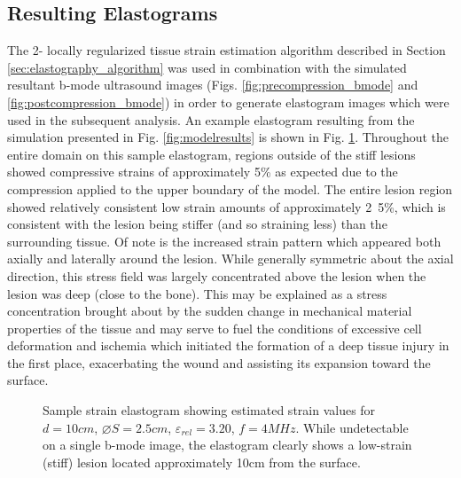 		\subsection{Resulting Elastograms}
			\label{sec:elastogram}
			The 2- locally regularized tissue strain estimation algorithm described in Section \ref{sec:elastography_algorithm} was used in combination with the simulated resultant b-mode ultrasound images (Figs. \ref{fig:precompression_bmode} and \ref{fig:postcompression_bmode}) in order to generate elastogram images which were used in the subsequent analysis. An example elastogram resulting from the simulation presented in Fig. \ref{fig:modelresults} is shown in Fig. \ref{fig:sample_elastogram}. Throughout the entire domain on this sample elastogram, regions outside of the stiff lesions showed compressive strains of approximately \unit{5}{\%} as expected due to the compression applied to the upper boundary of the model. The entire lesion region showed relatively consistent low strain amounts of approximately \unit{2.5}{\%}, which is consistent with the lesion being stiffer (and so straining less) than the surrounding tissue. Of note is the increased strain pattern which appeared both axially and laterally around the lesion. While generally symmetric about the axial direction, this stress field was largely concentrated above the lesion when the lesion was deep (close to the bone). This may be explained as a stress concentration brought about by the sudden change in mechanical material properties of the tissue and may serve to fuel the conditions of excessive cell deformation and ischemia which initiated the formation of a deep tissue injury in the first place, exacerbating the wound and assisting its expansion toward the surface.

			\begin{figure}[!t]
				\centering
				\caption[Sample strain elastogram with a stiff lesion]{Sample strain elastogram showing estimated strain values for $d=\unit{10}{cm}$, $\diameter S = \unit{2.5}{cm}$, $\varepsilon_{rel} = 3.20$, $f = \unit{4}{MHz}$. While undetectable on a single b-mode image, the elastogram clearly shows a low-strain (stiff) lesion located approximately \unit{10}{cm} from the surface.}
				\label{fig:sample_elastogram}
			\end{figure}

